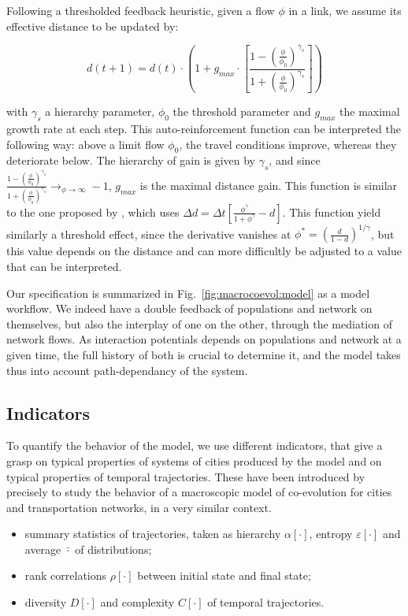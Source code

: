 \documentclass[11pt]{article}
\begin{document}
Following a thresholded feedback heuristic, given a flow $\phi$ in a link, we assume its effective distance to be updated by:

\begin{equation}
\label{eq:nwthresholdgrowth}
d(t+1) = d(t)\cdot \left( 1 + g_{max} \cdot \left[\frac{1 - \left(\frac{\phi}{\phi_0}\right)^{\gamma_s}}{1 + \left(\frac{\phi}{\phi_0}\right)^{\gamma_s}}\right]\right)
\end{equation}

with $\gamma_s$ a hierarchy parameter, $\phi_0$ the threshold parameter and $g_{max}$ the maximal growth rate at each step. This auto-reinforcement function can be interpreted the following way: above a limit flow $\phi_0$, the travel conditions improve, whereas they deteriorate below. The hierarchy of gain is given by $\gamma_s$, and since $\frac{1 - \left(\frac{\phi}{\phi_0}\right)^{\gamma_s}}{1 + \left(\frac{\phi}{\phi_0}\right)^{\gamma_s}} \rightarrow_{\phi\rightarrow \infty} -1$, $g_{max}$ is the maximal distance gain. This function is similar to the one proposed by \cite{tero2007mathematical}, which uses $\Delta d = \Delta t \left[ \frac{\phi^\gamma}{1 + \phi^\gamma} - d\right]$. This function yield similarly a threshold effect, since the derivative vanishes at $\phi^{\ast} = \left(\frac{d}{1 - d}\right)^{1/\gamma}$, but this value depends on the distance and can more difficultly be adjusted to a value that can be interpreted.


Our specification is summarized in Fig.~\ref{fig:macrocoevol:model} as a model workflow. We indeed have a double feedback of populations and network on themselves, but also the interplay of one on the other, through the mediation of network flows. As interaction potentials depends on populations and network at a given time, the full history of both is crucial to determine it, and the model takes thus into account path-dependancy of the system.



\subsection{Indicators}

To quantify the behavior of the model, we use different indicators, that give a grasp on typical properties of systems of cities produced by the model and on typical properties of temporal trajectories. These have been introduced by \cite{2018arXiv180900861R} precisely to study the behavior of a macroscopic model of co-evolution for cities and transportation networks, in a very similar context.
\begin{itemize}
	\item summary statistics of trajectories, taken as hierarchy $\alpha\left[\cdot\right]$, entropy $\varepsilon\left[\cdot\right]$ and average $\bar{\cdot}$ of distributions;
	\item rank correlations $\rho\left[\cdot\right]$ between initial state and final state;
	\item diversity $D\left[\cdot\right]$ and complexity $C\left[\cdot\right]$ of temporal trajectories.
\end{itemize}
\end{document}
